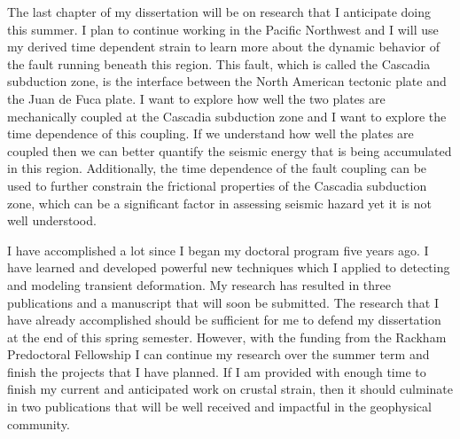 The last chapter of my dissertation will be on research that I anticipate doing this summer.  I plan to continue working in the Pacific Northwest and I will use my derived time dependent strain to learn more about the dynamic behavior of the fault running beneath this region.  This fault, which is called the Cascadia subduction zone, is the interface between the North American tectonic plate and the Juan de Fuca plate.  I want to explore how well the two plates are mechanically coupled at the Cascadia subduction zone and I want to explore the time dependence of this coupling.  If we understand how well the plates are coupled then we can better quantify the seismic energy that is being accumulated in this region.  Additionally, the time dependence of the fault coupling can be used to further constrain the frictional properties of the Cascadia subduction zone, which can be a significant factor in assessing seismic hazard yet it is not well understood.     

I have accomplished a lot since I began my doctoral program five years ago. I have learned and developed powerful new techniques which I applied to detecting and modeling transient deformation.  My research has resulted in three publications and a manuscript that will soon be submitted.  The research that I have already accomplished should be sufficient for me to defend my dissertation at the end of this spring semester.  However, with the funding from the Rackham Predoctoral Fellowship I can continue my research over the summer term and finish the projects that I have planned. If I am provided with enough time to finish my current and anticipated work on crustal strain, then it should culminate in two publications that will be well received and impactful in the geophysical community. 
  
